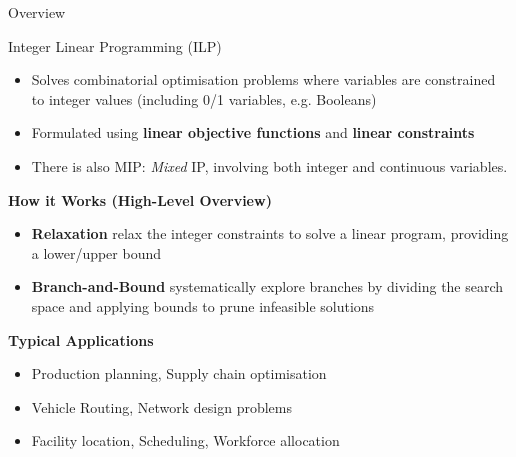 \documentclass{cons-beamer}
\begin{document}
\begin{frame}{Overview}
\end{frame}


\begin{frame}{Integer Linear Programming (ILP)}

  \begin{itemize}
    \item Solves combinatorial optimisation problems where variables are constrained to integer values (including 0/1 variables, e.g. Booleans)
    \item Formulated using \textbf{linear objective functions} and \textbf{linear constraints}
    \item There is also MIP: \textit{Mixed} IP, involving both integer and continuous variables.
  \end{itemize}
  \vfill

  \textbf{How it Works (High-Level Overview)}  $ $\\
  \begin{itemize}
    \item \textbf{Relaxation} relax the integer constraints to solve a linear program, providing a lower/upper bound
    \item \textbf{Branch-and-Bound} systematically explore branches by dividing the search space and applying bounds to prune infeasible solutions
  \end{itemize}
  \vfill

  \textbf{Typical Applications}
  \begin{itemize}
    \item Production planning, Supply chain optimisation
    \item Vehicle Routing, Network design problems
    \item Facility location, Scheduling, Workforce allocation
  \end{itemize}
\end{frame}
\end{document}
